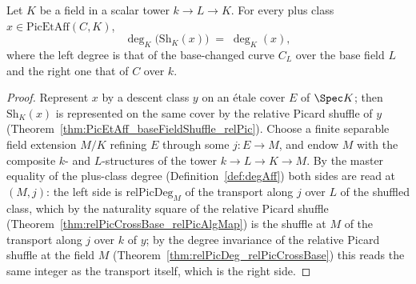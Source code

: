 \begin{theorem}
  \label{thm:degAff_baseFieldShuffle}
  \leanok
  Let \(K\) be a field in a scalar tower \(k \to L \to K\).  For every plus class
  \(x \in \mathrm{PicEtAff}(C, K)\),
  \[
    \deg_K\bigl(\mathrm{Sh}_K(x)\bigr) \;=\; \deg_K(x),
  \]
  where the left degree is that of the base-changed curve \(C_L\) over the base field
  \(L\) and the right one that of \(C\) over \(k\).
\end{theorem}
\begin{proof}
  \leanok
  Represent \(x\) by a descent class \(y\) on an \'etale cover \(E\) of \(\Spec K\);
  then \(\mathrm{Sh}_K(x)\) is represented on the same cover by the relative Picard
  shuffle of \(y\) (Theorem~\ref{thm:PicEtAff_baseFieldShuffle_relPic}).  Choose a
  finite separable field extension \(M/K\) refining \(E\) through some
  \(j \colon E \to M\), and endow \(M\) with the composite \(k\)- and \(L\)-structures
  of the tower \(k \to L \to K \to M\).  By the master equality of the plus-class
  degree (Definition~\ref{def:degAff}) both sides are read at \((M, j)\): the left
  side is \(\mathrm{relPicDeg}_M\) of the transport along \(j\) over \(L\) of the
  shuffled class, which by the naturality square of the relative Picard shuffle
  (Theorem~\ref{thm:relPicCrossBase_relPicAlgMap}) is the shuffle at \(M\) of the
  transport along \(j\) over \(k\) of \(y\); by the degree invariance of the relative
  Picard shuffle at the field \(M\)
  (Theorem~\ref{thm:relPicDeg_relPicCrossBase}) this reads the same integer as the
  transport itself, which is the right side.
\end{proof}

